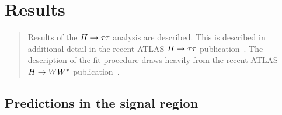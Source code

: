 \chapter[Results][Results]{Results}
\label{chap:results}

\begin{quote}
  Results of the $H\rightarrow\tau\tau$ analysis are described. This is described in additional detail in the recent ATLAS $H\rightarrow\tau\tau$ publication~\cite{HIGG-2013-32}. The description of the fit procedure draws heavily from the recent ATLAS $H\rightarrow WW^\ast$ publication~\cite{HIGG-2013-13}.
\end{quote}

\section{Predictions in the signal region}
\label{sec:results-prefit}

\clearpage

